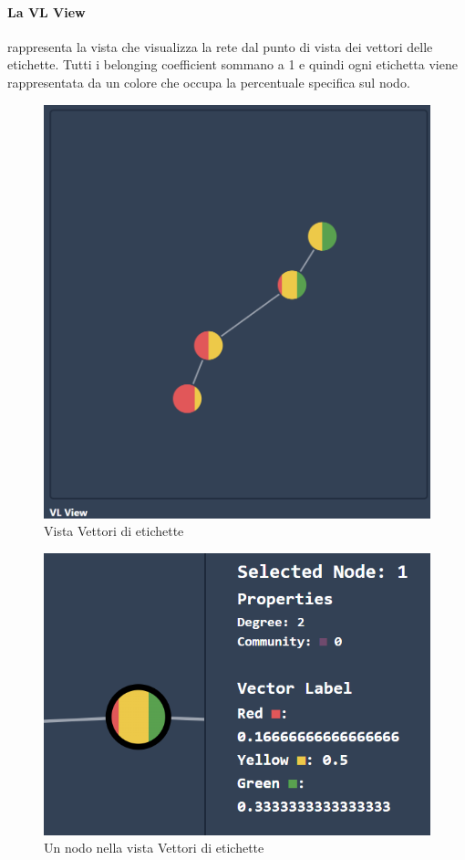 \documentclass[a4paper,12pt]{report}
\begin{document}
\pagebreak

			\paragraph*{La VL View} rappresenta la vista che visualizza la rete dal punto di vista dei vettori delle etichette. Tutti i belonging coefficient sommano a 1 e quindi ogni etichetta viene rappresentata da un colore che occupa la percentuale specifica sul nodo.
			
			\begin{center}
			\begin{figure}[H]
			\centering
			\includegraphics[width=0.9\linewidth,keepaspectratio]{vlview}
			\caption{Vista Vettori di etichette}
			\end{figure}
			\end{center}

			\begin{center}
			\begin{figure}[H]
			\centering
			\includegraphics[width=0.8\linewidth,keepaspectratio]{vlrep}
			\caption{Un nodo nella vista Vettori di etichette}
			\label{fig:vlrep}
			\end{figure}
			\end{center}
\end{document}

